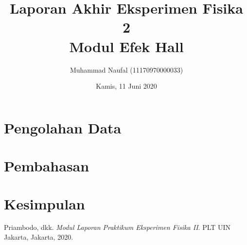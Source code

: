 \documentclass{article}
\title{Laporan Akhir Eksperimen Fisika 2\\
Modul Efek Hall}
\author{ Muhammad Naufal (11170970000033) }
\date{ Kamis, 11 Juni 2020 }
\begin{document}
	\maketitle

	\section{Pengolahan Data}
	
	\section{Pembahasan}

	\section{Kesimpulan}

	\begin{thebibliography}{9}
		Priambodo, dkk. 
		\textit{Modul Laporan Praktikum Eksperimen Fisika II}. 
		PLT UIN Jakarta, Jakarta, 2020.
	\end{thebibliography}
	
\end{document}
